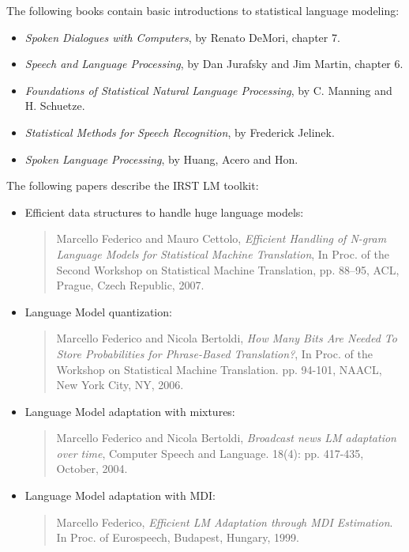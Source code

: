The following books contain basic introductions to statistical language modeling:
\begin{itemize}
\item {\em Spoken Dialogues with Computers}, by Renato DeMori, chapter 7.
\item {\em Speech  and Language Processing},  by Dan  Jurafsky and  Jim Martin, chapter 6.
\item {\em Foundations   of  Statistical   Natural  Language   Processing},  by C. Manning and H. Schuetze.
\item {\em Statistical Methods for Speech Recognition}, by Frederick Jelinek.
\item {\em Spoken Language Processing}, by Huang, Acero and Hon.
\end{itemize}

\noindent
The following papers describe the IRST LM toolkit:
\begin{itemize}

\item Efficient data structures to handle huge language models:
\begin{quote}
Marcello Federico and Mauro Cettolo, {\em Efficient Handling of N-gram Language Models for Statistical Machine Translation}, In Proc. of the Second Workshop on Statistical Machine Translation, pp. 88--95, ACL, Prague, Czech Republic, 2007.
\end{quote}

\item Language Model quantization:
\begin{quote}
Marcello Federico and Nicola Bertoldi, {\em How Many Bits Are Needed To Store Probabilities for Phrase-Based Translation?}, In Proc. of the Workshop on Statistical Machine Translation. pp. 94-101, NAACL, New York City, NY, 2006. 
\end{quote}


\item Language Model adaptation with mixtures:
\begin{quote}
Marcello Federico and Nicola Bertoldi, {\em Broadcast news LM adaptation over time}, Computer Speech and Language. 18(4): pp. 417-435, October, 2004.
\end{quote}
\item Language Model adaptation with MDI:
\begin{quote}
Marcello Federico, {\em Efficient LM Adaptation through MDI Estimation}. In Proc. of Eurospeech, Budapest, Hungary, 1999.
\end{quote}
\end{itemize}


